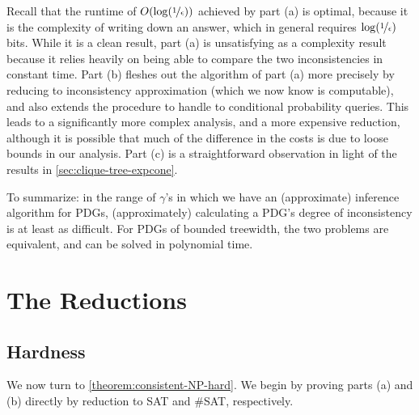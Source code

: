 Recall that the runtime of $O(\log(\nicefrac1\epsilon))$ achieved by part (a) is optimal, because it is the complexity of writing down an answer, which in general requires $\log(\nicefrac 1\epsilon)$ bits. 
While it is a clean result, part (a) is unsatisfying as a complexity result because it relies heavily on being able to compare the two inconsistencies in constant time.
Part (b) fleshes out the algorithm of part (a) more precisely 
    by reducing to inconsistency approximation (which we now know is computable), 
    and also extends the procedure to handle to conditional probability queries. 
This leads to a significantly more complex analysis, and a more expensive reduction, although it is possible that much of the difference in the costs is due to loose bounds in our analysis. 
Part (c) is a straightforward observation in light of 
    the results in \cref{sec:clique-tree-expcone}.

To summarize: in the range of $\gamma$'s in which we have an (approximate) inference algorithm for PDGs, (approximately) calculating a PDG's degree of inconsistency is at least as difficult.
For PDGs of bounded treewidth, the two problems are equivalent, and can be solved in polynomial time. 



\section{The Reductions}
    \label{proofs:the-reductions}
    
\subsection{Hardness }
    \label{proofs:hardness-results}

We now turn to \cref{theorem:consistent-NP-hard}. We begin by proving
parts (a) and (b) directly
by reduction to SAT and \#SAT, respectively.

